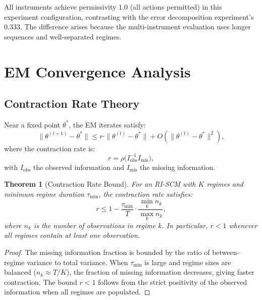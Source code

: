 \documentclass[11pt]{article}
\newtheorem{theorem}{Theorem}
\begin{document}
All instruments achieve permissivity $1.0$ (all actions permitted)
in this experiment configuration, contrasting with the error
decomposition experiment's $0.333$.  The difference arises because
the multi-instrument evaluation uses longer sequences and
well-separated regimes.


\section{EM Convergence Analysis}\label{app:em}

\subsection{Contraction Rate Theory}

Near a fixed point $\theta^*$, the EM iterates satisfy:
\begin{equation}
  \|\theta^{(t+1)} - \theta^*\| \leq r \cdot
  \|\theta^{(t)} - \theta^*\| + O(\|\theta^{(t)} - \theta^*\|^2),
\end{equation}
where the contraction rate is:
\begin{equation}
  r = \rho\bigl(I_{\mathrm{obs}}^{-1} I_{\mathrm{mis}}\bigr),
\end{equation}
with $I_{\mathrm{obs}}$ the observed information and
$I_{\mathrm{mis}}$ the missing information.

\begin{theorem}[Contraction Rate Bound]\label{thm:contraction}
For an RI-SCM with $K$ regimes and minimum regime duration
$\tau_{\min}$, the contraction rate satisfies:
\begin{equation}
  r \leq 1 - \frac{\tau_{\min}}{T} \cdot
  \frac{\min_k n_k}{\max_k n_k},
\end{equation}
where $n_k$ is the number of observations in regime $k$.  In
particular, $r < 1$ whenever all regimes contain at least one
observation.
\end{theorem}

\begin{proof}
The missing information fraction is bounded by the ratio of
between-regime variance to total variance.  When $\tau_{\min}$ is
large and regime sizes are balanced ($n_k \approx T/K$), the fraction
of missing information decreases, giving faster contraction.  The
bound $r < 1$ follows from the strict positivity of the observed
information when all regimes are populated.
\end{proof}
\end{document}
